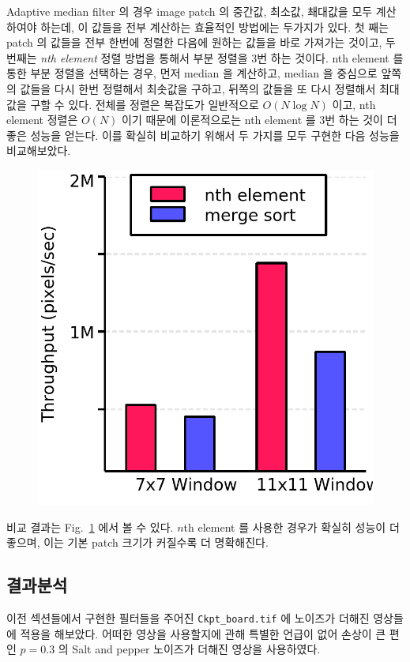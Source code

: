 \documentclass[a4paper, 12p]{paper}
\def\code#1{\texttt{#1}}
\begin{document}
  Adaptive median filter 의 경우 image patch 의 중간값, 최소값, 쵀대값을 모두 계산하여야 하는데, 이 값들을 전부 계산하는 효율적인 방법에는 두가지가 있다. 첫 째는 patch 의 값들을 전부 한번에 정렬한 다음에 원하는 값들을 바로 가져가는 것이고, 두 번째는 \textit{nth element} 정렬 방법을 통해서 부분 정렬을 3번 하는 것이다. nth element 를 통한 부분 정렬을 선택하는 경우, 먼저 median 을 계산하고, median 을 중심으로 앞쪽의 값들을 다시 한번 정렬해서 최솟값을 구하고, 뒤쪽의 값들을 또 다시 정렬해서 최대값을 구할 수 있다. 전체를 정렬은 복잡도가 일반적으로 $O(N \log N)$ 이고, nth element 정렬은 $O(N)$ 이기 때문에 이론적으로는 nth element 를 3번 하는 것이 더 좋은 성능을 얻는다. 이를 확실히 비교하기 위해서 두 가지를 모두 구현한 다음 성능을 비교해보았다.

\begin{figure}[H]
\centering
\includegraphics[scale=0.5]{../data/adapt_perf.png}\label{fig:perf}
\end{figure}

비교 결과는 Fig.~\ref{fig:perf} 에서 볼 수 있다. $n$th element 를 사용한 경우가 확실히 성능이 더 좋으며, 이는 기본 patch 크기가 커질수록 더 명확해진다. 


\subsection{결과분석}
이전 섹션들에서 구현한 필터들을 주어진 \code{Ckpt\_board.tif} 에 노이즈가 더해진 영상들에 적용을 해보았다. 어떠한 영상을 사용할지에 관해 특별한 언급이 없어 손상이 큰 편인 $p=0.3$ 의 Salt and pepper 노이즈가 더해진 영상을 사용하였다.
\end{document}
